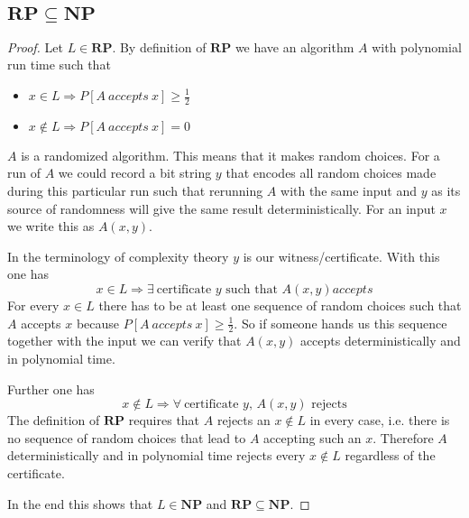 \documentclass[10pt,a4paper]{article}
\begin{document}
\subsection*{$\mathbf{RP \subseteq NP}$}

\begin{proof}
  Let $L \in \mathbf{RP}$.
  By definition of $\mathbf{RP}$ we have an algorithm $A$ with polynomial run time such that
  \begin{itemize}
  \item $x \in L \Rightarrow P[A\ accepts\ x] \ge \frac{1}{2}$
  \item $x \notin L \Rightarrow P[A\ accepts\ x] = 0$
  \end{itemize}

  $A$ is a randomized algorithm.
  This means that it makes random choices.
  For a run of $A$ we could record a bit string $y$ that encodes all random choices made during this particular run such that rerunning $A$ with the same input and $y$ as its source of randomness will give the same result deterministically.
  For an input $x$ we write this as $A(x, y)$.

  In the terminology of complexity theory $y$ is our witness/certificate.
  With this one has
  \begin{equation*}
    x \in L \Rightarrow \exists\ \text{certificate $y$ such that $A(x, y) accepts$}
  \end{equation*}
  For every $x \in L$ there has to be at least one sequence of random choices such that $A$ accepts $x$ because $P[A\ accepts\ x] \ge \frac{1}{2}$.
  So if someone hands us this sequence together with the input we can verify that $A(x, y)$ accepts deterministically and in polynomial time.

  Further one has
  \begin{equation*}
    x \notin L \Rightarrow \forall\ \text{certificate $y$, $A(x, y)$ rejects}
  \end{equation*}
  The definition of $\mathbf{RP}$ requires that $A$ rejects an $x \notin L$ in every case, i.e. there is no sequence of random choices that lead to $A$ accepting such an $x$.
  Therefore $A$ deterministically and in polynomial time rejects every $x \notin L$ regardless of the certificate.

  In the end this shows that $L \in \mathbf{NP}$ and $\mathbf{RP} \subseteq \mathbf{NP}$.
\end{proof}
\end{document}
